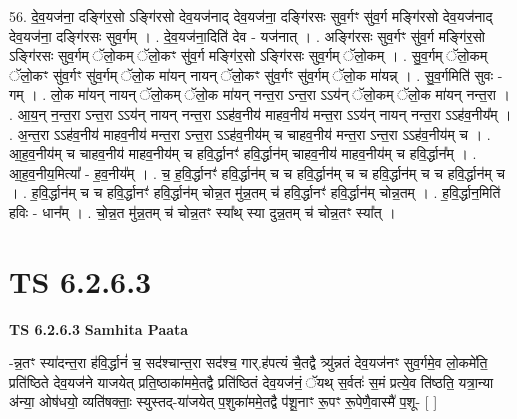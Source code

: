 \documentclass[17pt]{extarticle}
\begin{document}
56. दे॒व॒यज॑ना॒ दङ्गि॑र॒सो ऽङ्गि॑रसो देव॒यज॑नाद् देव॒यज॑ना॒ दङ्गि॑रसः सुव॒र्गꣳ सु॑व॒र्ग मङ्गि॑रसो देव॒यज॑नाद् देव॒यज॑ना॒ दङ्गि॑रसः सुव॒र्गम् । . दे॒व॒यज॑ना॒दिति॑ देव - यज॑नात् । . अङ्गि॑रसः सुव॒र्गꣳ सु॑व॒र्ग मङ्गि॑र॒सो ऽङ्गि॑रसः सुव॒र्गम् ॅलो॒कम् ॅलो॒कꣳ सु॑व॒र्ग मङ्गि॑र॒सो ऽङ्गि॑रसः सुव॒र्गम् ॅलो॒कम् । . सु॒व॒र्गम् ॅलो॒कम् ॅलो॒कꣳ सु॑व॒र्गꣳ सु॑व॒र्गम् ॅलो॒क मा॑यन् नायन् ॅलो॒कꣳ सु॑व॒र्गꣳ सु॑व॒र्गम् ॅलो॒क मा॑यन्न् । . सु॒व॒र्गमिति॑ सुवः - गम् । . लो॒क मा॑यन् नायन् ॅलो॒कम् ॅलो॒क मा॑यन् नन्त॒रा ऽन्त॒रा ऽऽय॑न् ॅलो॒कम् ॅलो॒क मा॑यन् नन्त॒रा । . आ॒य॒न् न॒न्त॒रा ऽन्त॒रा ऽऽय॑न् नायन् नन्त॒रा ऽऽह॑व॒नीय॑ माहव॒नीय॑ मन्त॒रा ऽऽय॑न् नायन् नन्त॒रा ऽऽह॑व॒नीय᳚म् । . अ॒न्त॒रा ऽऽह॑व॒नीय॑ माहव॒नीय॑ मन्त॒रा ऽन्त॒रा ऽऽह॑व॒नीय॑म् च चाहव॒नीय॑ मन्त॒रा ऽन्त॒रा ऽऽह॑व॒नीय॑म् च । . आ॒ह॒व॒नीय॑म् च चाहव॒नीय॑ माहव॒नीय॑म् च हवि॒र्द्धानꣳ॑ हवि॒र्द्धान॑म् चाहव॒नीय॑ माहव॒नीय॑म् च हवि॒र्द्धान᳚म् । . आ॒ह॒व॒नीय॒मित्या᳚ - ह॒व॒नीय᳚म् । . च॒ ह॒वि॒र्द्धानꣳ॑ हवि॒र्द्धान॑म् च च हवि॒र्द्धान॑म् च च हवि॒र्द्धान॑म् च च हवि॒र्द्धान॑म् च । . ह॒वि॒र्द्धान॑म् च च हवि॒र्द्धानꣳ॑ हवि॒र्द्धान॑म् चोन्न॒त मु॑न्न॒तम् च॑ हवि॒र्द्धानꣳ॑ हवि॒र्द्धान॑म् चोन्न॒तम् । . ह॒वि॒र्द्धान॒मिति॑ हविः - धान᳚म् । . चो॒न्न॒त मु॑न्न॒तम् च॑ चोन्न॒तꣳ स्या᳚थ् स्या दुन्न॒तम् च॑ चोन्न॒तꣳ स्या᳚त् । \newline
\pagebreak
{}

\section{ TS 6.2.6.3 }

\textbf{TS 6.2.6.3 } \newline
\textbf{Samhita Paata} \newline

-न्न॒तꣳ स्या॑दन्त॒रा ह॑वि॒र्द्धानं॑ च॒ सद॑श्चान्त॒रा सद॑श्च॒ गार्.ह॑पत्यं चै॒तद्वै त्र्यु॑न्नतं देव॒यज॑नꣳ सुव॒र्गमे॒व लो॒कमे॑ति॒ प्रति॑ष्ठिते देव॒यज॑ने याजयेत् प्रति॒ष्ठाका॑ममे॒तद्वै प्रति॑ष्ठितं देव॒यज॑नं॒ ॅयथ् स॒र्वतः॑ स॒मं प्रत्ये॒व ति॑ष्ठति॒ यत्रा॒न्या अ॑न्या॒ ओष॑धयो॒ व्यति॑षक्ताः॒ स्युस्तद्-या॑जयेत् प॒शुका॑ममे॒तद्वै प॑शू॒नाꣳ रू॒पꣳ रू॒पेणै॒वास्मै॑ प॒शू- [  ] \newline
\end{document}
